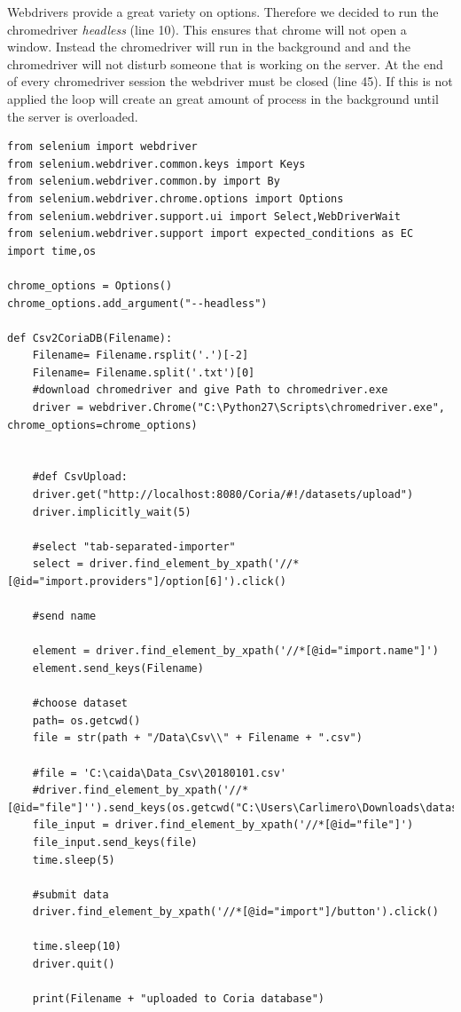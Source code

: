 \documentclass[conference, 11pt]{IEEEtran}
\begin{document}
Webdrivers provide a great variety on options. Therefore we decided to run the chromedriver \textit{headless} (line 10). This ensures that chrome will not open a window. Instead the chromedriver will run in the background and and the chromedriver will not disturb someone that is working on the server. At the end of every chromedriver session the webdriver must be closed (line 45). If this is not applied the loop will create an great amount of process in the background until the server is overloaded.


\begin{lstlisting}[float=*]
from selenium import webdriver
from selenium.webdriver.common.keys import Keys
from selenium.webdriver.common.by import By
from selenium.webdriver.chrome.options import Options
from selenium.webdriver.support.ui import Select,WebDriverWait
from selenium.webdriver.support import expected_conditions as EC
import time,os

chrome_options = Options()  
chrome_options.add_argument("--headless")  

def Csv2CoriaDB(Filename):
	Filename= Filename.rsplit('.')[-2]
	Filename= Filename.split('.txt')[0]
	#download chromedriver and give Path to chromedriver.exe
	driver = webdriver.Chrome("C:\Python27\Scripts\chromedriver.exe", chrome_options=chrome_options)


	#def CsvUpload:
	driver.get("http://localhost:8080/Coria/#!/datasets/upload")
	driver.implicitly_wait(5)

	#select "tab-separated-importer"
	select = driver.find_element_by_xpath('//*[@id="import.providers"]/option[6]').click()

	#send name
	
	element = driver.find_element_by_xpath('//*[@id="import.name"]')
	element.send_keys(Filename)

	#choose dataset
	path= os.getcwd()
	file = str(path + "/Data\Csv\\" + Filename + ".csv")

	#file = 'C:\caida\Data_Csv\20180101.csv'
	#driver.find_element_by_xpath('//*[@id="file"]'').send_keys(os.getcwd("C:\Users\Carlimero\Downloads\datastructrue.txt")')
	file_input = driver.find_element_by_xpath('//*[@id="file"]')
	file_input.send_keys(file)
	time.sleep(5)

	#submit data
	driver.find_element_by_xpath('//*[@id="import"]/button').click()

	time.sleep(10)
	driver.quit()

	print(Filename + "uploaded to Coria database")
\end{lstlisting}
\end{document}

